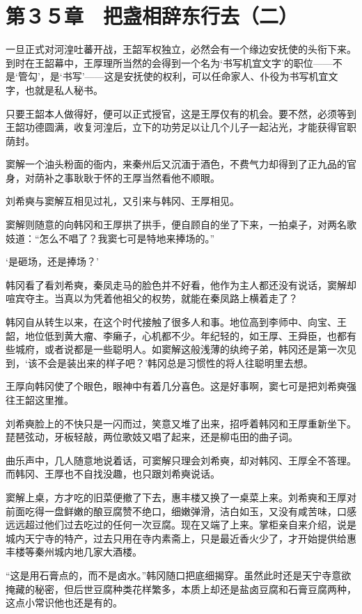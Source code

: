 \section{第３５章　把盏相辞东行去（二）}

一旦正式对河湟吐蕃开战，王韶军权独立，必然会有一个缘边安抚使的头衔下来。到时在王韶幕中，王厚理所当然的会得到一个名为‘书写机宜文字’的职位——不是‘管勾’，是‘书写’——这是安抚使的权利，可以任命家人、仆役为书写机宜文字，也就是私人秘书。

只要王韶本人做得好，便可以正式授官，这是王厚仅有的机会。要不然，必须等到王韶功德圆满，收复河湟后，立下的功劳足以让几个儿子一起沾光，才能获得官职荫封。

窦解一个油头粉面的衙内，来秦州后又沉湎于酒色，不费气力却得到了正九品的官身，对荫补之事耿耿于怀的王厚当然看他不顺眼。

刘希奭与窦解互相见过礼，又引来与韩冈、王厚相见。

窦解则随意的向韩冈和王厚拱了拱手，便自顾自的坐了下来，一拍桌子，对两名歌妓道：“怎么不唱了？我窦七可是特地来捧场的。”

‘是砸场，还是捧场？’

韩冈看了看刘希奭，秦凤走马的脸色并不好看，他作为主人都还没有说话，窦解却喧宾夺主。当真以为凭着他祖父的权势，就能在秦凤路上横着走了？

韩冈自从转生以来，在这个时代接触了很多人和事。地位高到李师中、向宝、王韶，地位低到黄大瘤、李癞子，心机都不少。年纪轻的，如王厚、王舜臣，也都有些城府，或者说都是一些聪明人。如窦解这般浅薄的纨绔子弟，韩冈还是第一次见到，‘该不会是装出来的样子吧？’韩冈总是习惯性的将人往聪明里去想。

王厚向韩冈使了个眼色，眼神中有着几分喜色。这是好事啊，窦七可是把刘希奭强往王韶这里推。

刘希奭脸上的不快只是一闪而过，笑意又堆了出来，招呼着韩冈和王厚重新坐下。琵琶弦动，牙板轻敲，两位歌妓又唱了起来，还是柳屯田的曲子词。

曲乐声中，几人随意地说着话，可窦解只理会刘希奭，却对韩冈、王厚全不答理。而韩冈、王厚也不自找没趣，也只跟刘希奭说话。

窦解上桌，方才吃的旧菜便撤了下去，惠丰楼又换了一桌菜上来。刘希奭和王厚对前面吃得一盘鲜嫩的酿豆腐赞不绝口，细嫩弹滑，洁白如玉，又没有咸苦味，口感远远超过他们过去吃过的任何一次豆腐。现在又端了上来。掌柜亲自来介绍，说是城内天宁寺的特产，过去只用在寺内素斋上，只是最近香火少了，才开始提供给惠丰楼等秦州城内地几家大酒楼。

“这是用石膏点的，而不是卤水。”韩冈随口把底细揭穿。虽然此时还是天宁寺意欲掩藏的秘密，但后世豆腐种类花样繁多，本质上却还是盐卤豆腐和石膏豆腐两种，这点小常识他也还是有的。

